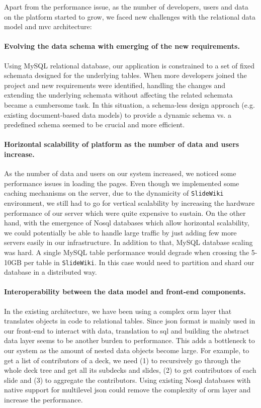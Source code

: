 \documentclass[PhD, Submit, ngerman,UKenglish,table]{scrbook}
\begin{document}
Apart from the performance issue, as the number of developers, users and data on the platform started to grow, we faced new challenges with the relational data model and \gls{mvc} architecture:


\paragraph{Evolving the data schema with emerging of the new requirements.} 
Using MySQL relational database, our application is constrained to a set of fixed schemata designed for the underlying tables.
When more developers joined the project and new requirements were identified, handling the changes and extending the underlying  schemata without affecting the related schemata became a cumbersome task.
In this situation, a schema-less design approach (e.g. existing document-based data models) to provide a dynamic schema vs. a predefined schema seemed to be crucial and more efficient.

\paragraph{Horizontal scalability of platform as the number of data and users increase.}
As the number of data and users on our system increased, we noticed some performance issues in loading the pages.
Even though we implemented some caching mechanisms on the server, due to the dynamicity of \texttt{SlideWiki} environment, we still had to go for vertical scalability by increasing the hardware performance of our server which were quite expensive to sustain.
On the other hand, with the emergence of No\gls{sql} databases which allow horizontal scalability, we could potentially be able to handle large traffic by just adding few more servers easily in our infrastructure.
In addition to that, MySQL database scaling was hard.
A single MySQL table performance would degrade when crossing the 5-10GB per table in \texttt{SlideWiki}.
In this case would need to partition and shard our database in a distributed way.

\paragraph{Interoperability between the data model and front-end components.}
In the existing architecture, we have been using a complex \gls{orm} layer that translates objects in code to relational tables.
Since \gls{json} format is mainly used in our front-end to interact with data, translation to \gls{sql} and building the abstract data layer seems to be another burden to performance.
This adds a bottleneck to our system as the amount of nested data objects become large.
For example, to get a list of contributors of a deck, we need (1) to recursively go through the whole deck tree and get all its subdecks and slides, (2) to get contributors of each slide and (3) to aggregate the contributors.
Using existing No\gls{sql} databases with native support for multilevel \gls{json} could remove the complexity of \gls{orm} layer and increase the performance.
\end{document}
